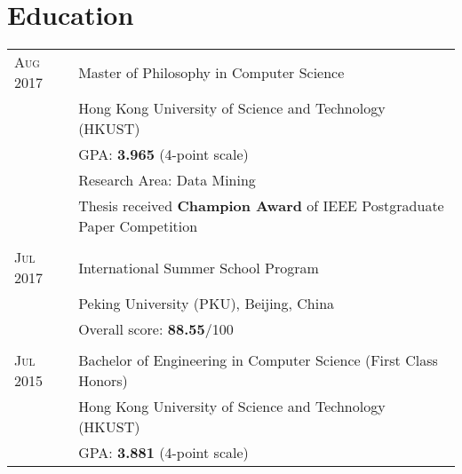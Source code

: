 \documentclass[10pt, oneside]{article}
\def \b {\textbf}
\begin{document}
\section*{Education}
\begin{tabularx}{\linewidth}{p{2.2cm}|p{17cm}}
	\toprule 
\textsc{Aug} 2017   & Master of Philosophy in Computer Science\\
& Hong Kong University of Science and Technology (HKUST)\\
& GPA: \b{3.965} (4-point scale)\\
& Research Area: Data Mining\\
& Thesis received \textbf{Champion Award} of IEEE Postgraduate Paper Competition\\
\\
\textsc{Jul} 2017  & International Summer School Program \\
& Peking University (PKU), Beijing, China
	\\& Overall score: \textbf{88.55}/100
\\\\
\textsc{Jul} 2015  & Bachelor of Engineering in Computer Science (First Class Honors)\\
& Hong Kong University of Science and Technology (HKUST)\\
& GPA: \b{3.881} (4-point scale) %
\\

\end{tabularx}
\end{document}

